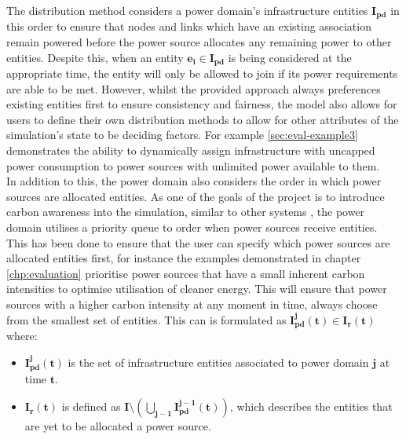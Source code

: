 \documentclass{l4proj}
\begin{document}
The distribution method considers a power domain's infrastructure entities $\mathbf{I_{pd}}$ in this order to ensure that nodes and links which have an existing association remain powered before the power source allocates any remaining power to other entities.
Despite this, when an entity $\mathbf{e_{i} \in I_{pd}}$ is being considered at the appropriate time, the entity will only be allowed to join if its power requirements are able to be met.
However, whilst the provided approach always preferences existing entities first to ensure consistency and fairness, the model also allows for users to define their own distribution methods to allow for other attributes of the simulation's state to be deciding factors.
For example \ref{sec:eval-example3} demonstrates the ability to dynamically assign infrastructure with uncapped power consumption to power sources with unlimited power available to them.\\

In addition to this, the power domain also considers the order in which power sources are allocated entities.
As one of the goals of the project is to introduce carbon awareness into the simulation, similar to other systems \cite{cucumber}, the power domain utilises a priority queue to order when power sources receive entities.
This has been done to ensure that the user can specify which power sources are allocated entities first, for instance the examples demonstrated in chapter \ref{chp:evaluation} prioritise power sources that have a small inherent carbon intensities to optimise utilisation of cleaner energy.
This will ensure that power sources with a higher carbon intensity at any moment in time, always choose from the smallest set of entities.
This can is formulated as $\mathbf{I_{pd}^j(t) \in I_{r}(t)}$ where:
\begin{itemize}
    \item $\mathbf{I_{pd}^j(t)}$ is the set of infrastructure entities associated to power domain $\mathbf{j}$ at time $\mathbf{t}$.\\
    \item $\mathbf{I_{r}(t)}$ is defined as $\mathbf{I \setminus \left( \bigcup_{j-1} I_{pd}^{j-1}(t) \right)}$, which describes the entities that are yet to be allocated a power source.
\end{itemize}
\end{document}
